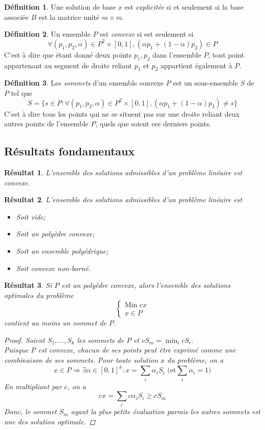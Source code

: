 \documentclass[a4paper]{report}
\theoremstyle{definition}
\newtheorem*{definition}{Définition}
\theoremstyle{remark}
\theoremstyle{plain}
\newtheorem*{result}{Résultat}
\begin{document}
\begin{definition}
Une solution de base \(x\) est \emph{explicitée} si et
seulement si la base associée \(B\) est la matrice unité \(m\times m\).
\end{definition}

\begin{definition}
Un ensemble \(P\) est \emph{convexe} si est seulement
si
\[\forall (p_1,p_2,\alpha)\in P^2\times[0,1],(\alpha p_1+(1-\alpha)p_2)\in P\]
C'est à dire que étant donné deux points \(p_1,p_2\) dans l'ensemble \(P\),
tout point appartenant au segment de droite reliant \(p_1\) et \(p_2\)
appartient également à \(P\).
\end{definition}

\begin{definition}
Les \emph{sommets} d'un ensemble convexe \(P\) est un sous-ensemble \(S\) de
\(P\) tel que
\[S=\{s\in P:\forall (p_1,p_2,\alpha)\in P^2\times[0,1],(\alpha p_1+(1-\alpha)p_2)\neq s\}\]
C'est à dire tous les points qui ne se situent pas sur une droite reliant deux
autres points de l'ensemble \(P\), quels que soient ces derniers points.
\end{definition}

\subsection{Résultats fondamentaux}
\begin{result}
L'ensemble des solutions admissibles d'un problème linéaire est convexe.
\end{result}

\begin{result}
L'ensemble des solutions admissibles d'un problème linéaire est
\begin{itemize}
	\item Soit vide;
	\item Soit un polyèdre convexe;
	\item Soit un ensemble polyédrique;
	\item Soit convexe non-borné.
\end{itemize}
\end{result}

\begin{result}
Si \(P\) est un polyèdre convexe, alors l'ensemble des solutions optimales
du problème
\[\begin{cases}
\text{Min }cx\\
x\in P
\end{cases}\]
contient au moins un sommet de \(P\).
\begin{proof}
Soient \(S_1,\dots,S_k\) les sommets de \(P\) et \(cS_m=\min_icS_i\).\\
Puisque \(P\) est convexe, chacun de ses points peut être exprimé comme une
combinaison de ses sommets. Pour toute solution \(x\) du problème, on a
\[x\in P\Rightarrow \exists \alpha\in[0,1]^k:x=\sum_i \alpha_iS_i\text{ (et}\sum_i\alpha_i=1\text{)}\]
En multipliant par \(c\), on a
\[cx=\sum_ic\alpha_iS_i\ge cS_m\]
Donc, le sommet \(S_m\) ayant la plus petite évaluation parmis les autres
sommets est une des solution optimale.
\end{proof}
\end{result}
\end{document}
